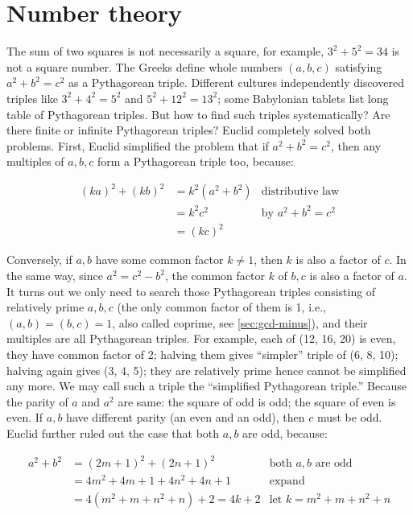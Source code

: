 \documentclass[b5paper]{article}
\begin{document}
\section{Number theory}
The sum of two squares is not necessarily a square, for example, $3^2 + 5^2 = 34$ is not a square number. The Greeks define whole numbers $(a, b, c)$ satisfying $a^2 + b^2 = c^2$ as a Pythagorean triple. Different cultures independently discovered triples like $3^2 + 4^2 = 5^2$ and $5^2 + 12^2 = 13^2$; some Babylonian tablets list long table of Pythagorean triples. But how to find such triples systematically? Are there finite or infinite Pythagorean triples? Euclid completely solved both problems. First, Euclid simplified the problem that if $a^2 + b^2 = c^2$, then any multiples of $a, b, c$ form a Pythagorean triple too, because:

\begin{align*}
(ka)^2 + (kb)^2 &= k^2(a^2 + b^2) & \text{distributive law} \\
  &= k^2c^2 & \text{by } a^2 + b^2 = c^2 \\
  &= (kc)^2
\end{align*}

Conversely, if $a, b$ have some common factor $k \ne 1$, then $k$ is also a factor of $c$. In the same way, since $a^2 = c^2 - b^2$, the common factor $k$ of $b, c$ is also a factor of $a$. It turns out we only need to search those Pythagorean triples consisting of relatively prime $a, b, c$ (the only common factor of them is 1, i.e., $(a, b) = (b, c) = 1$, also called coprime, see \cref{sec:gcd-minus}), and their multiples are all Pythagorean triples. For example, each of (12, 16, 20) is even, they have common factor of 2; halving them gives \enquote{simpler} triple of (6, 8, 10); halving again gives (3, 4, 5); they are relatively prime hence cannot be simplified any more. We may call such a triple the \enquote{simplified Pythagorean triple.} Because the parity of $a$ and $a^2$ are same: the square of odd is odd; the square of even is even. If $a, b$ have different parity (an even and an odd), then $c$ must be odd. Euclid further ruled out the case that both $a, b$ are odd, because:

\begin{align*}
a^2 + b^2 &= (2m + 1)^2 + (2n + 1)^2 & \text{both }a, b\text{ are odd} \\
  &= 4m^2 + 4m + 1 + 4n^2 + 4n + 1 & \text{expand} \\
  &= 4(m^2 + m + n^2 + n) + 2 = 4k + 2 & \text{let } k = m^2 + m + n^2 + n
\end{align*}
\end{document}
